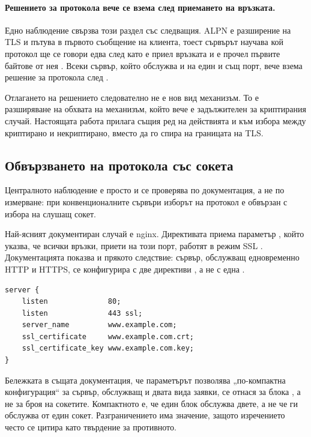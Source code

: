 \paragraph{Решението за протокола вече се взема след приемането на връзката.} Едно наблюдение
свързва този раздел със следващия. ALPN е разширение на TLS и пътува в първото съобщение на
клиента, тоест сървърът научава кой протокол ще се говори едва след като е приел връзката и е
прочел първите байтове от нея \cite{rfc7301}. Всеки сървър, който обслужва  и
 на един и същ порт, вече взема решение за протокола след .

Отлагането на решението следователно не е нов вид механизъм. То е разширяване на обхвата на
механизъм, който вече е задължителен за криптирания случай. Настоящата работа прилага същия
ред на действията и към избора между криптирано и некриптирано, вместо да го спира на
границата на TLS.

\subsection{Обвързването на протокола със сокета}
\label{sec:baseline}

Централното наблюдение е просто и се проверява по документация, а не по измерване: при
конвенционалните сървъри изборът на протокол е обвързан с избора на слушащ сокет.

Най-ясният документиран случай е nginx. Директивата  приема параметър
, който указва, че всички връзки, приети на този порт, работят в режим SSL
\cite{nginxlisten}. Документацията показва и прякото следствие: сървър, обслужващ едновременно
HTTP и HTTPS, се конфигурира с две директиви , а не с една \cite{nginxhttps}.

\begin{lstlisting}[caption={Един сървър, два слушащи сокета, по документацията на nginx},label={lst:nginx-two}]
server {
    listen              80;
    listen              443 ssl;
    server_name         www.example.com;
    ssl_certificate     www.example.com.crt;
    ssl_certificate_key www.example.com.key;
}
\end{lstlisting}

Бележката в същата документация, че параметърът позволява „по-компактна конфигурация“ за
сървър, обслужващ и двата вида заявки, се отнася за блока , а не за броя на
сокетите. Компактното е, че един блок обслужва двете, а не че ги обслужва от един сокет.
Разграничението има значение, защото изречението често се цитира като твърдение за
противното.

